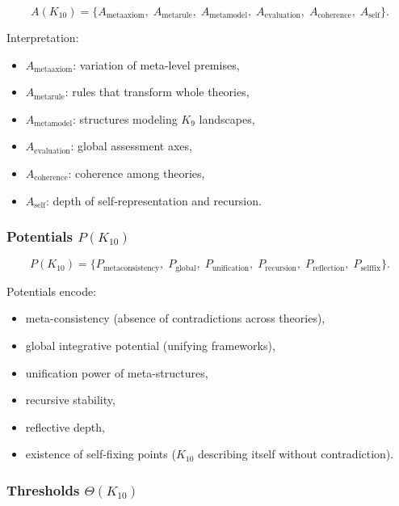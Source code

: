 \[
A(K_{10})=
\{
A_{\mathrm{metaaxiom}},\;
A_{\mathrm{metarule}},\;
A_{\mathrm{metamodel}},\;
A_{\mathrm{evaluation}},\;
A_{\mathrm{coherence}},\;
A_{\mathrm{self}}
\}.
\]

Interpretation:
\begin{itemize}
    \item $A_{\mathrm{metaaxiom}}$: variation of meta-level premises,
    \item $A_{\mathrm{metarule}}$: rules that transform whole theories,
    \item $A_{\mathrm{metamodel}}$: structures modeling $K_9$ landscapes,
    \item $A_{\mathrm{evaluation}}$: global assessment axes,
    \item $A_{\mathrm{coherence}}$: coherence among theories,
    \item $A_{\mathrm{self}}$: depth of self-representation and recursion.
\end{itemize}

\subsubsection{Potentials $P(K_{10})$}

\[
P(K_{10})=
\{
P_{\mathrm{metaconsistency}},\;
P_{\mathrm{global}},\;
P_{\mathrm{unification}},\;
P_{\mathrm{recursion}},\;
P_{\mathrm{reflection}},\;
P_{\mathrm{selffix}}
\}.
\]

Potentials encode:
\begin{itemize}
    \item meta-consistency (absence of contradictions across theories),
    \item global integrative potential (unifying frameworks),
    \item unification power of meta-structures,
    \item recursive stability,
    \item reflective depth,
    \item existence of self-fixing points ($K_{10}$ describing itself without contradiction).
\end{itemize}

\subsubsection{Thresholds $\Theta(K_{10})$}

